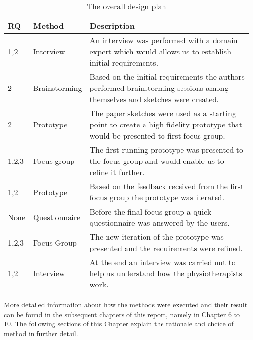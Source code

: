 \begin{table}[h!]
  \centering
  \begin{tabular}{|p{0.7cm}|p{2cm}|p{9cm}|}
    \hline
    \textbf{RQ} & \textbf{Method} & \textbf{Description} \\ \hline
    1,2 & Interview & An interview was performed with a domain expert which would allows us to establish initial requirements. \\ \hline
    2 & Brainstorming & Based on the initial requirements the authors performed brainstorming sessions among themselves and sketches were created. \\ \hline
    2 & Prototype & The paper sketches were used as a starting point to create a high fidelity prototype that would be presented to first focus group. \\ \hline
    1,2,3 & Focus group & The first running prototype was presented to the focus group and would enable us to refine it further. \\ \hline
    1,2 & Prototype & Based on the feedback received from the first focus group the prototype was iterated. \\ \hline
    None & Questionnaire & Before the final focus group a quick questionnaire was answered by the users. \\ \hline
    1,2,3 & Focus Group & The new iteration of the prototype was presented and the requirements were refined. \\ \hline
    1,2 & Interview & At the end an interview was carried out to help us understand how the physiotherapists work. \\ \hline
  \end{tabular}
  \caption{The overall design plan}
  \label{tab:designPlan}
\end{table}

More detailed information about how the methods were executed and their result can be found in the subsequent chapters of this report, namely in Chapter 6 to 10. The following sections of this Chapter explain the rationale and choice of method in further detail.
 
